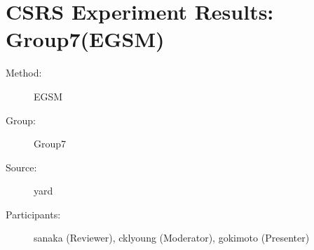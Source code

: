 \chapter {CSRS Experiment Results: Group7(EGSM)}
\small

\begin{description}
\item [Method:] EGSM
\item [Group:] Group7
\item [Source:] yard
\item [Participants:] sanaka (Reviewer), cklyoung (Moderator), gokimoto (Presenter)
\end{description}
